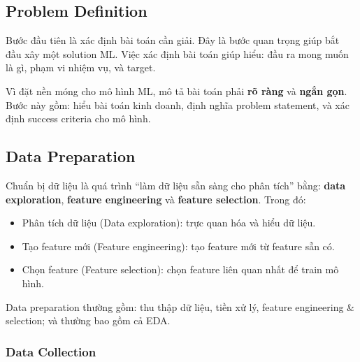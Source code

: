 \subsection{Problem Definition}

\begin{dongco}[title={Bước đầu tiên: xác định bài toán}]
Bước đầu tiên là xác định bài toán cần giải. Đây là bước quan trọng giúp bắt đầu xây một solution ML.
Việc xác định bài toán giúp hiểu: đầu ra mong muốn là gì, phạm vi nhiệm vụ, và target.
\end{dongco}

\begin{luuy}[title={Yêu cầu của problem definition}]
Vì đặt nền móng cho mô hình ML, mô tả bài toán phải \textbf{rõ ràng} và \textbf{ngắn gọn}.
Bước này gồm: hiểu bài toán kinh doanh, định nghĩa problem statement, và xác định success criteria cho mô hình.
\end{luuy}

\subsection{Data Preparation}

\begin{dinhnghia}[title={Data preparation là gì?}]
Chuẩn bị dữ liệu là quá trình “làm dữ liệu sẵn sàng cho phân tích” bằng:
\textbf{data exploration}, \textbf{feature engineering} và \textbf{feature selection}.
Trong đó:
\begin{itemize}
  \item Phân tích dữ liệu (Data exploration): trực quan hóa và hiểu dữ liệu.
  \item Tạo feature mới (Feature engineering): tạo feature mới từ feature sẵn có.
  \item Chọn feature (Feature selection): chọn feature liên quan nhất để train mô hình.
\end{itemize}
\end{dinhnghia}

\begin{ynghia}[title={Các bước trong data preparation}]
Data preparation thường gồm: thu thập dữ liệu, tiền xử lý, feature engineering \& selection; và thường bao gồm cả EDA.
\end{ynghia}

\subsubsection{Data Collection}

